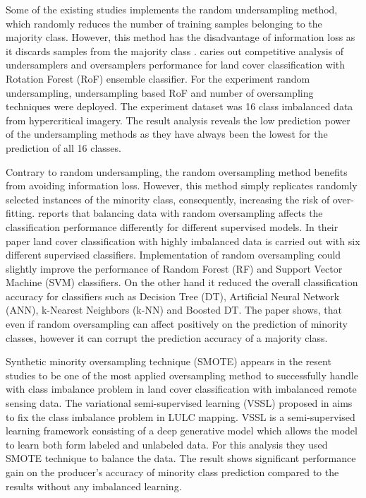 \documentclass[parskip=full]{scrartcl}
\begin{document}
Some of the existing studies implements the random undersampling method, 
which randomly reduces the number of training samples  belonging to the 
majority class. However, this method has the disadvantage of information loss 
as it discards samples from the majority class  \cite{Feng2019}. 
\cite{Feng2018} caries out competitive analysis of  undersamplers and 
oversamplers performance for land cover classification with  Rotation Forest 
(RoF) ensemble classifier. For the experiment random  undersampling, 
undersampling based RoF and number of oversampling techniques  were deployed. 
The experiment dataset was 16 class imbalanced data from  hypercritical 
imagery. The result analysis reveals the low prediction power of the 
undersampling methods as they have always been the lowest for the prediction of 
all 16 classes.
 
Contrary to random undersampling, the random oversampling method benefits from 
avoiding information loss. However, this method simply replicates randomly 
selected instances of the minority class, consequently, increasing the risk of 
over-fitting. \cite{Maxwell2018} reports that balancing data with random 
oversampling affects the classification performance differently for different 
supervised models. In their paper land cover classification with highly 
imbalanced data is carried out with six different supervised classifiers. 
Implementation of random oversampling could slightly improve the performance of 
Random Forest (RF) and Support Vector Machine (SVM) classifiers. On the other 
hand it reduced the overall classification accuracy for classifiers such as 
Decision Tree (DT), Artificial Neural Network (ANN), k-Nearest Neighbors (k-NN) 
and Boosted DT. The paper shows, that even if random oversampling can affect 
positively on the prediction of minority classes, however it can corrupt the 
prediction accuracy of a majority class.

Synthetic minority oversampling technique (SMOTE) appears in the resent studies 
to be one of the most applied oversampling method to successfully handle with 
class imbalance problem in land cover classification with imbalanced remote 
sensing data. The variational semi-supervised learning (VSSL) proposed in 
\cite{Cenggoro2018} aims to fix the class imbalance problem in LULC mapping. 
VSSL is a semi-supervised learning framework consisting of a deep generative 
model which allows the model to learn both form labeled and unlabeled data. For 
this analysis they used SMOTE technique to balance the data. The result shows 
significant performance gain on the producer's accuracy of minority class 
prediction compared to the results without any imbalanced learning. 
\end{document}

